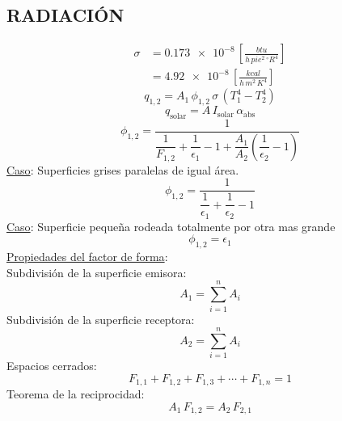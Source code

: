 \documentclass[letter,oneside,10pt]{article}
\begin{document}
\begin{multicols}{3}
\section*{RADIACIÓN}
\vspace{-0.5cm}
\begin{equation*}
    \begin{split}
    \sigma
        &= \num{0.173e-8}\,\left[\frac{btu}{h\,pie^2\,^\circ R^4}\right]\\
        &= \num{4.92e-8}\,\left[\frac{kcal}{h\,m^2\,K^4}\right]
    \end{split}
\end{equation*}
\vspace{-0.3cm}
\begin{equation*}
    q_{1,2} = A_1\,\phi_{1,2}\,\sigma\,(T_1^4 - T_2^4)
\end{equation*}
\vspace{-0.1cm}
\begin{equation*}
    q_{\text{solar}} = A\,I_{\text{solar}}\,\alpha_{\text{abs}}
\end{equation*}
\vspace{-0.1cm}
\begin{equation*}
    \phi_{1,2} = \dfrac{1}{\dfrac{1}{F_{1,2}}+\dfrac{1}{\epsilon_1}-1
    +\dfrac{A_1}{A_2}\left(\dfrac{1}{\epsilon_2}-1\right)}
\end{equation*}
\underline{Caso}: Superficies grises paralelas de igual área.
\vspace{0.1cm}
\begin{equation*}
    \phi_{1,2} = \dfrac{1}{\dfrac{1}{\epsilon_1}+\dfrac{1}{\epsilon_2}-1}
\end{equation*}
\underline{Caso}: Superficie pequeña rodeada totalmente por otra mas grande
\vspace{-0.3cm}
\begin{equation*}
    \phi_{1,2} = \epsilon_1
\end{equation*}
\underline{Propiedades del factor de forma}:\\
Subdivisión de la superficie emisora:
\vspace{-0.3cm}
\begin{equation*}
    A_1 = \sum_{i=1}^n A_i
\end{equation*}
Subdivisión de la superficie receptora:
\vspace{-0.3cm}
\begin{equation*}
    A_2 = \sum_{i=1}^n A_i
\end{equation*}
Espacios cerrados:
\vspace{-0.3cm}
\begin{equation*}
    F_{1,1} + F_{1,2} + F_{1,3} + \cdots + F_{1,n} = 1
\end{equation*}
Teorema de la reciprocidad:
\vspace{-0.3cm}
\begin{equation*}
    A_1\,F_{1,2} = A_2\,F_{2,1}
\end{equation*}
\end{multicols}
\end{document}
